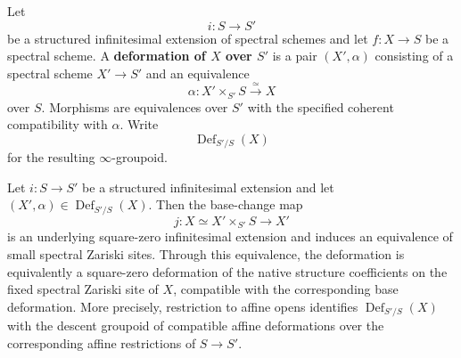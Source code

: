\begin{definition}
\label{def:global-deformation-square-zero}
Let
\[
    i:S\longrightarrow S'
\]
be a structured infinitesimal extension of spectral schemes and let
\(f:X\to S\) be a spectral scheme. A \textbf{deformation of \(X\) over
\(S'\)} is a pair \((X',\alpha)\) consisting of a spectral scheme
\(X'\to S'\) and an equivalence
\[
    \alpha:X'\times_{S'}S\xrightarrow{\simeq}X
\]
over \(S\). Morphisms are equivalences over \(S'\) with the specified
coherent compatibility with \(\alpha\). Write
\[
    \operatorname{Def}_{S'/S}(X)
\]
for the resulting \(\infty\)-groupoid.
\end{definition}

\begin{lemma}
\label{lem:fixed-zariski-site-deformation}
Let \(i:S\to S'\) be a structured infinitesimal extension and let
\((X',\alpha)\in\operatorname{Def}_{S'/S}(X)\). Then the base-change map
\[
    j:X\simeq X'\times_{S'}S\longrightarrow X'
\]
is an underlying square-zero infinitesimal extension and induces an equivalence
of small spectral Zariski sites. Through this equivalence, the deformation is
equivalently a square-zero deformation of the native structure coefficients on
the fixed spectral Zariski site of \(X\), compatible with the corresponding
base deformation. More precisely, restriction to affine opens identifies
\(\operatorname{Def}_{S'/S}(X)\) with the descent groupoid of compatible
affine deformations over the corresponding affine restrictions of
\(S\to S'\).
\end{lemma}

